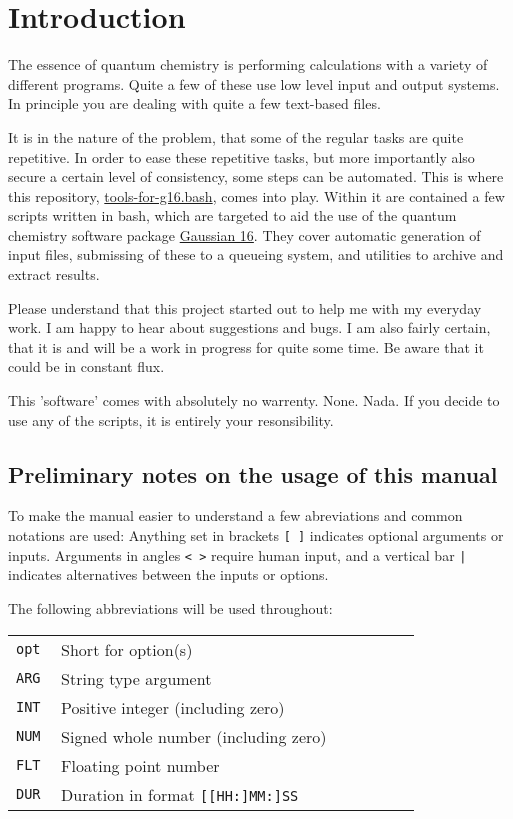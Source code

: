 \documentclass[   %
  final,          %
  a4paper         %
]{article}
\begin{document}
\section{Introduction}

The essence of quantum chemistry is performing calculations with a variety of different programs.
Quite a few of these use low level input and output systems.
In principle you are dealing with quite a few text-based files.

It is in the nature of the problem, 
that some of the regular tasks are quite repetitive.
In order to ease these repetitive tasks,
but more importantly also secure a certain level of consistency,
some steps can be automated.
This is where this repository, 
\href{https://github.com/polyluxus/tools-for-g16.bash}{tools-for-g16.bash},
comes into play.
Within it are contained a few scripts written in bash,
which are targeted to aid the use of the quantum chemistry software package 
\href{http://gaussian.com/}{Gaussian 16}.
They cover automatic generation of input files,
submissing of these to a queueing system,
and utilities to archive and extract results.

Please understand that this project started out to help me with my everyday work. 
I am happy to hear about suggestions and bugs. 
I am also fairly certain, that it is and will be a work in progress for quite some time.
Be aware that it could be in constant flux. 

This 'software' comes with absolutely no warrenty. None. Nada.
If you decide to use any of the scripts, it is entirely your resonsibility.

\subsection{Preliminary notes on the usage of this manual}

To make the manual easier to understand a few abreviations 
and common notations are used:
Anything set in brackets \lstinline{[ ]} indicates optional arguments or inputs.
Arguments in angles \lstinline{< >} require human input, 
and a vertical bar \lstinline{|} indicates alternatives between the inputs or options.

The following abbreviations will be used throughout:

\begin{tabular}{p{0.1\linewidth}p{0.8\linewidth}}
  {\lstinline!opt!} & Short for option(s) \\
  {\lstinline!ARG!} & String type argument \\
  {\lstinline!INT!} & Positive integer (including zero) \\
  {\lstinline!NUM!} & Signed whole number (including zero) \\
  {\lstinline!FLT!} & Floating point number \\
  {\lstinline!DUR!} & Duration in format {\lstinline![[HH:]MM:]SS!}  \\
\end{tabular}
\end{document}
